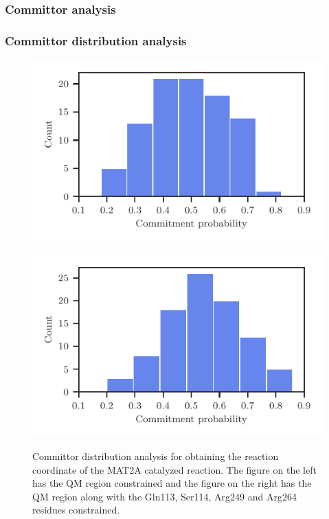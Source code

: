 \documentclass{beamer}
\begin{document}
\begin{frame}
\frametitle{Committor analysis}

\end{frame}
\begin{frame}
\frametitle{Committor distribution analysis}
\begin{figure}[ht!]
\centering
\begin{minipage}[b]{0.45\linewidth}
\includegraphics[width=\textwidth]{figures/comm-60-mat2a-nocons.pdf}
\label{fig:minipage1}
\end{minipage}
\quad
\begin{minipage}[b]{0.45\linewidth}
\includegraphics[width=\textwidth]{figures/comm-60-mat2a.pdf}
\label{fig:minipage2}
\end{minipage}
\caption{Committor distribution analysis for obtaining the reaction coordinate of the 
MAT2A catalyzed reaction. The figure on the left has the QM region constrained and the figure 
on the right has the QM region along with the Gln113, Ser114, Arg249 and Arg264 residues constrained.}
\label{fig:mat2a-comm-dist}
\end{figure}
\end{frame}
\end{document}
